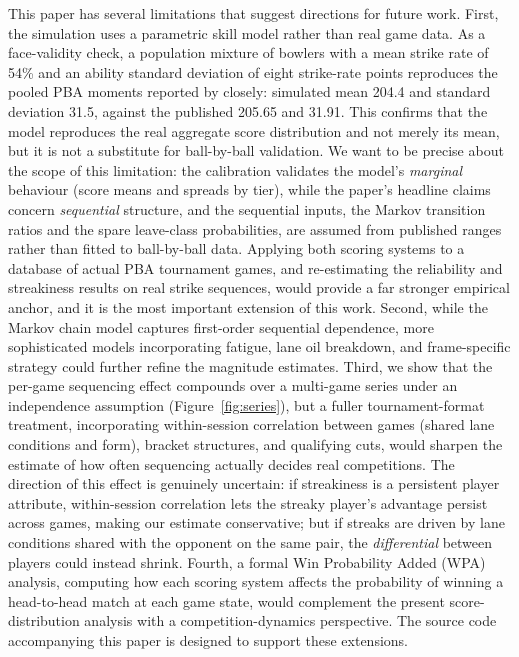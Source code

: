 \documentclass[USenglish]{article}
\theoremstyle{dgthm}
\theoremstyle{dgdef}
\begin{document}
This paper has several limitations that suggest directions for future work. First, the simulation uses a parametric skill model rather than real game data. As a face-validity check, a population mixture of bowlers with a mean strike rate of 54\% and an ability standard deviation of eight strike-rate points reproduces the pooled PBA moments reported by \citet{mccarthy2011} closely: simulated mean 204.4 and standard deviation 31.5, against the published 205.65 and 31.91. This confirms that the model reproduces the real aggregate score distribution and not merely its mean, but it is not a substitute for ball-by-ball validation. We want to be precise about the scope of this limitation: the calibration validates the model's \emph{marginal} behaviour (score means and spreads by tier), while the paper's headline claims concern \emph{sequential} structure, and the sequential inputs, the Markov transition ratios and the spare leave-class probabilities, are assumed from published ranges rather than fitted to ball-by-ball data. Applying both scoring systems to a database of actual PBA tournament games, and re-estimating the reliability and streakiness results on real strike sequences, would provide a far stronger empirical anchor, and it is the most important extension of this work. Second, while the Markov chain model captures first-order sequential dependence, more sophisticated models incorporating fatigue, lane oil breakdown, and frame-specific strategy could further refine the magnitude estimates. Third, we show that the per-game sequencing effect compounds over a multi-game series under an independence assumption (Figure~\ref{fig:series}), but a fuller tournament-format treatment, incorporating within-session correlation between games (shared lane conditions and form), bracket structures, and qualifying cuts, would sharpen the estimate of how often sequencing actually decides real competitions. The direction of this effect is genuinely uncertain: if streakiness is a persistent player attribute, within-session correlation lets the streaky player's advantage persist across games, making our estimate conservative; but if streaks are driven by lane conditions shared with the opponent on the same pair, the \emph{differential} between players could instead shrink. Fourth, a formal Win Probability Added (WPA) analysis, computing how each scoring system affects the probability of winning a head-to-head match at each game state, would complement the present score-distribution analysis with a competition-dynamics perspective. The source code accompanying this paper is designed to support these extensions.
\end{document}
